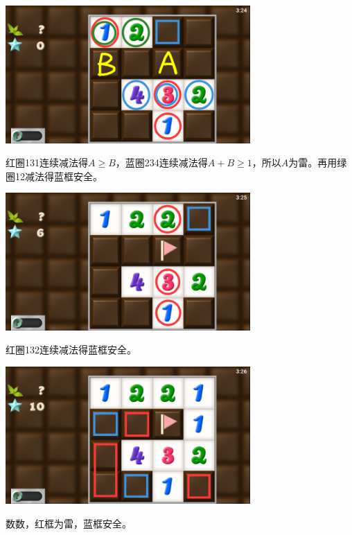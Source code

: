 \subsection{} %
\begin{center}
    \includegraphics[width=0.7\textwidth]{puzzle/157-1.png}
\end{center}
红圈131连续减法得$A\ge B$，蓝圈234连续减法得$A+B\ge 1$，所以$A$为雷。再用绿圈12减法得蓝框安全。
\begin{center}
    \includegraphics[width=0.7\textwidth]{puzzle/157-2.png}
\end{center}
红圈132连续减法得蓝框安全。
\begin{center}
    \includegraphics[width=0.7\textwidth]{puzzle/157-3.png}
\end{center}
数数，红框为雷，蓝框安全。

